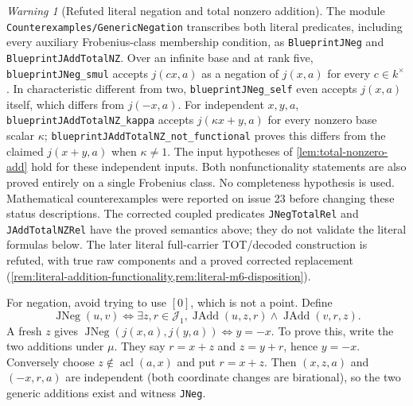 \documentclass[11pt,oneside]{article}
\theoremstyle{definition}
\theoremstyle{remark}
\newtheorem{warning}[theorem]{Warning}
\newcommand{\acl}{\operatorname{acl}}
\newcommand{\Jrel}{\mathcal{J}}
\newcommand{\lean}[1]{\nolinkurl{#1}}
\begin{document}
\begin{warning}[Refuted literal negation and total nonzero addition]
The module \lean{Counterexamples/GenericNegation} transcribes both literal predicates,
including every auxiliary Frobenius-class membership condition, as \lean{BlueprintJNeg}
and \lean{BlueprintJAddTotalNZ}. Over an infinite base and at rank five,
\lean{blueprintJNeg_smul} accepts $j(cx,a)$ as a negation of $j(x,a)$ for every
$c\in k^\times$. In characteristic different from two, \lean{blueprintJNeg_self}
even accepts $j(x,a)$ itself, which differs from $j(-x,a)$.
For independent $x,y,a$, \lean{blueprintJAddTotalNZ_kappa} accepts $j(\kappa x+y,a)$
for every nonzero base scalar $\kappa$; \lean{blueprintJAddTotalNZ_not_functional}
proves this differs from the claimed $j(x+y,a)$ when $\kappa\ne1$.
The input hypotheses of \cref{lem:total-nonzero-add} hold for these independent inputs.
Both nonfunctionality statements are also proved entirely on a single Frobenius class.
No completeness hypothesis is used. Mathematical counterexamples were reported on
issue 23 before changing these status descriptions. The corrected coupled predicates
\lean{JNegTotalRel} and \lean{JAddTotalNZRel} have the proved semantics above;
they do not validate the literal formulas below. The later literal full-carrier
TOT/decoded construction is refuted, with true raw components and a proved corrected
replacement (\cref{rem:literal-addition-functionality,rem:literal-m6-disposition}).
\end{warning}

For negation, avoid trying to use $[0]$, which is not a point.  Define
\[
 \operatorname{JNeg}(u,v)\Longleftrightarrow
 \exists z,r\in\Jrel_1,
 \operatorname{JAdd}(u,z,r)\land\operatorname{JAdd}(v,r,z).
\]
A fresh $z$ gives
$\operatorname{JNeg}(j(x,a),j(y,a))\Longleftrightarrow y=-x$.
To prove this, write the two additions under $\mu$.  They say
$r=x+z$ and $z=y+r$, hence $y=-x$.  Conversely choose
$z\notin\acl(a,x)$ and put $r=x+z$.  Then $(x,z,a)$ and
$(-x,r,a)$ are independent (both coordinate changes are birational), so the two generic
additions exist and witness \lean{JNeg}.
\end{document}
